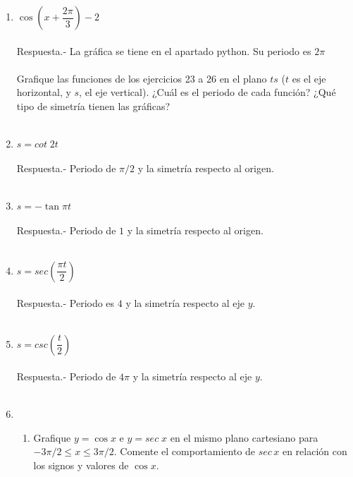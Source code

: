 \begin{enumerate}
\item $\cos \left(x+\dfrac{2\pi}{3}\right)-2$\\\\
    Respuesta.-\; La gráfica se tiene en el apartado python. Su periodo es $2\pi$\\\\

Grafique las funciones de los ejercicios 23 a 26 en el plano $ts$ ($t$ es el eje horizontal, y $s$, el eje vertical). ¿Cuál es el periodo de cada función? ¿Qué tipo de simetría tienen las gráficas?\\\\

\item $s=cot\; 2t$\\\\
    Respuesta.-\; Periodo de $\pi/2$ y la simetría respecto al origen.\\\\

\item $s=-\tan \pi t$\\\\
    Respuesta.-\; Periodo de $1$ y la simetría respecto al origen.\\\\

\item $s = sec\left(\dfrac{\pi t}{2}\right)$\\\\
    Respuesta.-\; Periodo es $4$ y la simetría respecto al eje $y$.\\\\

\item $s = csc\left(\dfrac{t}{2}\right)$\\\\
    Respuesta.-\; Periodo de $4\pi$ y la simetría respecto al eje $y$.\\\\

\item 
    \begin{enumerate}[\bfseries a)]

	\item Grafique $y=\cos x$ e $y=sec \; x$ en el mismo plano cartesiano para $-3\pi/2 \leq x \leq 3\pi/2$. Comente el comportamiento de $sec\, x$ en relación con los signos y valores de $\cos x$.\\\\


\end{enumerate}
\end{enumerate}
